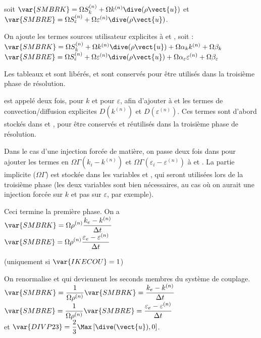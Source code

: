 soit $\var{SMBRK}=\Omega S_k^{(n)}+\Omega k^{(n)}\dive(\rho\vect{u})$
et $\var{SMBRE}=\Omega S_\varepsilon^{(n)}+\Omega\varepsilon^{(n)}\dive(\rho\vect{u})$.


On ajoute les termes sources utilisateur explicites \`a  et
, soit :\\
$\var{SMBRK}=\Omega S_k^{(n)}+\Omega k^{(n)}\dive(\rho\vect{u})+\Omega\alpha_k k^{(n)} +\Omega\beta_k$\\
$\var{SMBRE}=\Omega S_\varepsilon^{(n)}+\Omega\varepsilon^{(n)}\dive(\rho\vect{u})
+\Omega\alpha_\varepsilon \varepsilon^{(n)} +\Omega\beta_\varepsilon$

Les tableaux  et  sont lib\'er\'es,  et  sont
conserv\'es pour \^etre utilis\'es dans la troisi\`eme phase de r\'esolution.

 est appel\'e deux fois, pour $k$ et pour $\varepsilon$, afin
d'ajouter \`a  et  les termes de convection/diffusion
explicites $D(k^{(n)})$ et $D(\varepsilon^{(n)})$. Ces termes sont d'abord
stock\'es dans  et , pour \^etre conserv\'es et r\'eutilis\'es
dans la troisi\`eme phase de r\'esolution.


Dans le cas d'une injection forc\'ee de mati\`ere, on passe deux fois dans
 pour ajouter les termes en
$\Omega \Gamma (k_i-k^{(n)})$ et
$\Omega \Gamma (\varepsilon_i-\varepsilon^{(n)})$ \`a  et
. La partie implicite ($\Omega\Gamma$) est stock\'ee dans les
variables  et , qui seront utilis\'ees lors de la troisi\`eme
phase (les deux variables sont bien n\'ecessaires, au cas o\`u on aurait une
injection forc\'ee sur $k$ et pas sur $\varepsilon$, par exemple).

Ceci termine la premi\`ere phase. On a \\
$\displaystyle \var{SMBRK}=\Omega \rho^{(n)}\frac{k_e-k^{(n)}}{\Delta t}$\\
$\displaystyle \var{SMBRE}=\Omega \rho^{(n)}\frac{\varepsilon_e-\varepsilon^{(n)}}{\Delta t}$

(uniquement si $\var{IKECOU}=1$)

On renormalise  et  qui deviennent les seconds membres du
syst\`eme de couplage.\\
$\displaystyle \var{SMBRK}=\frac{1}{\Omega\rho^{(n)}}\var{SMBRK}
=\frac{k_e-k^{(n)}}{\Delta t}$\\
$\displaystyle \var{SMBRE}=\frac{1}{\Omega\rho^{(n)}}\var{SMBRE}
=\frac{\varepsilon_e-\varepsilon^{(n)}}{\Delta t}$\\
et $\displaystyle \var{DIVP23}=\frac{2}{3}\Max\left[\dive(\vect{u}),0\right]$.

